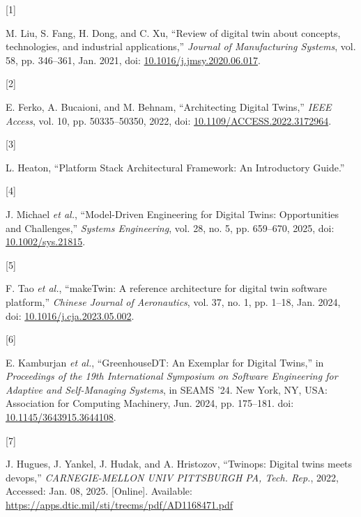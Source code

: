 \documentclass[
  12pt,
  a4paper,
]{article}
\newlength{\cslhangindent}
\newlength{\csllabelwidth}
\newenvironment{CSLReferences}[2] %
 {\begin{list}{}{%
  \setlength{\itemindent}{0pt}
  \setlength{\leftmargin}{0pt}
  \setlength{\parsep}{0pt}
  \ifodd #1
   \setlength{\leftmargin}{\cslhangindent}
   \setlength{\itemindent}{-1\cslhangindent}
  \fi
  \setlength{\itemsep}{#2\baselineskip}}}
 {\end{list}}
\newcommand{\CSLLeftMargin}[1]{\parbox[t]{\csllabelwidth}{\strut#1\strut}}
\newcommand{\CSLRightInline}[1]{\parbox[t]{\linewidth - \csllabelwidth}{\strut#1\strut}}
\begin{document}
\protect{}\label{refs}
\begin{CSLReferences}{0}{0}
\CSLLeftMargin{{[}1{]} }%
\CSLRightInline{M. Liu, S. Fang, H. Dong, and C. Xu, {``Review of
digital twin about concepts, technologies, and industrial
applications,''} \emph{Journal of Manufacturing Systems}, vol. 58, pp.
346--361, Jan. 2021, doi:
\href{https://doi.org/10.1016/j.jmsy.2020.06.017}{10.1016/j.jmsy.2020.06.017}.}

\CSLLeftMargin{{[}2{]} }%
\CSLRightInline{E. Ferko, A. Bucaioni, and M. Behnam, {``Architecting
{Digital} {Twins},''} \emph{IEEE Access}, vol. 10, pp. 50335--50350,
2022, doi:
\href{https://doi.org/10.1109/ACCESS.2022.3172964}{10.1109/ACCESS.2022.3172964}.}

\CSLLeftMargin{{[}3{]} }%
\CSLRightInline{L. Heaton, {``Platform {Stack} {Architectural}
{Framework}: {An} {Introductory} {Guide}.''}}

\CSLLeftMargin{{[}4{]} }%
\CSLRightInline{J. Michael \emph{et al.}, {``Model-{Driven}
{Engineering} for {Digital} {Twins}: {Opportunities} and
{Challenges},''} \emph{Systems Engineering}, vol. 28, no. 5, pp.
659--670, 2025, doi:
\href{https://doi.org/10.1002/sys.21815}{10.1002/sys.21815}.}

\CSLLeftMargin{{[}5{]} }%
\CSLRightInline{F. Tao \emph{et al.}, {``{makeTwin}: {A} reference
architecture for digital twin software platform,''} \emph{Chinese
Journal of Aeronautics}, vol. 37, no. 1, pp. 1--18, Jan. 2024, doi:
\href{https://doi.org/10.1016/j.cja.2023.05.002}{10.1016/j.cja.2023.05.002}.}

\CSLLeftMargin{{[}6{]} }%
\CSLRightInline{E. Kamburjan \emph{et al.}, {``{GreenhouseDT}: {An}
{Exemplar} for {Digital} {Twins},''} in \emph{Proceedings of the 19th
{International} {Symposium} on {Software} {Engineering} for {Adaptive}
and {Self}-{Managing} {Systems}}, in {SEAMS} '24. New York, NY, USA:
Association for Computing Machinery, Jun. 2024, pp. 175--181. doi:
\href{https://doi.org/10.1145/3643915.3644108}{10.1145/3643915.3644108}.}

\CSLLeftMargin{{[}7{]} }%
\CSLRightInline{J. Hugues, J. Yankel, J. Hudak, and A. Hristozov,
{``Twinops: {Digital} twins meets devops,''} \emph{CARNEGIE-MELLON UNIV
PITTSBURGH PA, Tech. Rep.}, 2022, Accessed: Jan. 08, 2025. {[}Online{]}.
Available: \url{https://apps.dtic.mil/sti/trecms/pdf/AD1168471.pdf}}


\end{CSLReferences}
\end{document}
